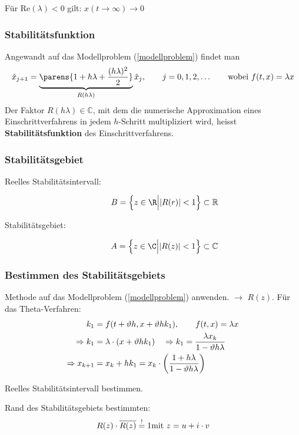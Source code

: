 		Für $\text{Re}(\lambda) < 0$ gilt: $x(t \to \infty) \to 0$

		\subsubsection{Stabilitätsfunktion}
			Angewandt auf das Modellproblem (\ref{modellproblem}) findet man
			\[
				\tilde x_{j+1} = \underbrace{\parens{1 + h\lambda + \frac{(h\lambda)^2}{2}}}_{R(h\lambda)}\tilde x_j, \qquad j=0,1,2,\dots \qquad \text{wobei } f(t,x) = \lambda x
			\]
			Der Faktor $R(h\lambda) \in \mathbb{C}$, mit dem die numerische Approximation eines Einschrittverfahrens in jedem $h$-Schritt multipliziert wird, heisst \textbf{Stabilitätsfunktion} des Einschrittverfahrens.

		\subsubsection{Stabilitätsgebiet}
			\begin{description}
				\item[Reelles Stabilitätsintervall:]
					\[
						B=\left\{ z \in \R \Big\vert |R(r)|<1\right\} \subset \mathbb{R}
					\]
				\item[Stabilitätsgebiet:]
					\[
						A=\left\{ z \in \C \Big\vert |R(z)|<1\right\} \subset \mathbb{C}
					\]
			\end{description}
		\subsubsection{Bestimmen des Stabilitätsgebiets}
			\begin{tightenumerate}
				\item Methode auf das Modellproblem (\ref{modellproblem}) anwenden. $\rightarrow$ $R(z)$. Für das Theta-Verfahren:
				\begin{align*}
					k_1 &= f(t+\vartheta h, x + \vartheta h k_1), \qquad f(t,x) = \lambda x \\
					\Rightarrow k_1 &= \lambda \cdot (x + \vartheta h k_1) \quad \Rightarrow \hfill k_1 = \frac{\lambda x_k}{1 - \vartheta h \lambda} \\
					\Rightarrow x_{k+1} &= x_k + hk_1 = x_k \cdot \left( \frac{1 + h\lambda}{1- \vartheta h \lambda}\right)
				\end{align*}
				\item Reelles Stabilitätsintervall bestimmen.
				\item Rand des Stabilitätsgebiets bestimmten:
				\[ R(z)\cdot\overline{R(z)} \overset{!}{=} 1 \hfill \text{mit } z= u + i \cdot v\]
			\end{tightenumerate}

